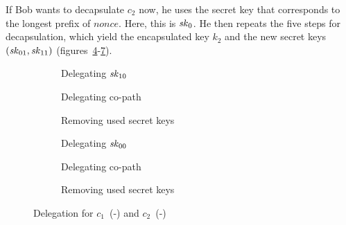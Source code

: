 If Bob wants to decapsulate $c_2$ now, he uses the secret key that corresponds to the longest prefix of $\mathit{nonce}$.
Here, this is $\mathit{sk}_0$.
He then repeats the five steps for decapsulation, which yield the encapsulated key $k_2$ and the new secret keys $(\mathit{sk}_{01},\mathit{sk}_{11})$ (figures~\ref{fig:fkem:hibe:example2-1}-\ref{fig:fkem:hibe:example2-4}).

\begin{figure}[!ht]
    \centering
    \begin{subfigure}{.33\textwidth}
        \centering
        
        \caption{Delegating $\mathit{sk}_{10}$}
        \label{fig:fkem:hibe:example1-1}
    \end{subfigure}\hfill
    \begin{subfigure}{.33\textwidth}
        \centering
        
        \caption{Delegating co-path}
        \label{fig:fkem:hibe:example1-3}
    \end{subfigure}
    \begin{subfigure}{.33\textwidth}
        \centering
        
        \caption{Removing used secret keys}
        \label{fig:fkem:hibe:example1-4}
    \end{subfigure}
    \begin{subfigure}{.33\textwidth}
        \centering
        
        \caption{Delegating $\mathit{sk}_{00}$}
        \label{fig:fkem:hibe:example2-1}
    \end{subfigure}\hfill
    \begin{subfigure}{.33\textwidth}
        \centering
        
        \caption{Delegating co-path}
        \label{fig:fkem:hibe:example2-3}
    \end{subfigure}
    \begin{subfigure}{.33\textwidth}
        \centering
        
        \caption{Removing used secret keys}
        \label{fig:fkem:hibe:example2-4}
    \end{subfigure}
    \caption{Delegation for $c_1$~(-) and $c_2$~(-)}
\end{figure}